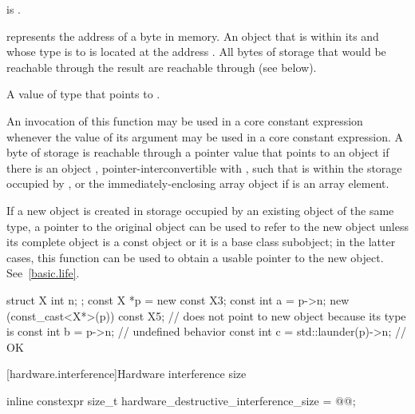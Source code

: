 \begin{itemdescr}
\pnum
\mandates
{} is .

\pnum
\expects
{} represents the address  of a byte in memory.
An object  that is within its 
and whose type is  to 
is located at the address .
All bytes of storage that would be reachable through the result
are reachable through  (see below).

\pnum
\returns
A value of type  that points to .

\pnum
\remarks
An invocation of this function
may be used in a core constant expression
whenever the value of its argument
may be used in a core constant expression.
A byte of storage  is
reachable through a pointer value
that points to an object 
if there is an object ,
pointer-interconvertible with ,
such that  is within the storage occupied by
, or
the immediately-enclosing array object if  is an array element.

\pnum
\begin{note}
If a new object is created
in storage occupied by an existing object of the same type,
a pointer to the original object
can be used to refer to the new object
unless its complete object is a const object or it is a base class subobject;
in the latter cases,
this function can be used to obtain a usable pointer to the new object.
See~\ref{basic.life}.
\end{note}

\pnum
\begin{example}
\begin{codeblock}
struct X { int n; };
const X *p = new const X{3};
const int a = p->n;
new (const_cast<X*>(p)) const X{5}; //  does not point to new object because its type is 
const int b = p->n;                 // undefined behavior
const int c = std::launder(p)->n;   // OK
\end{codeblock}
\end{example}
\end{itemdescr}

[hardware.interference]{Hardware interference size}

%
\begin{itemdecl}
inline constexpr size_t hardware_destructive_interference_size = @\impdef{}@;
\end{itemdecl}

